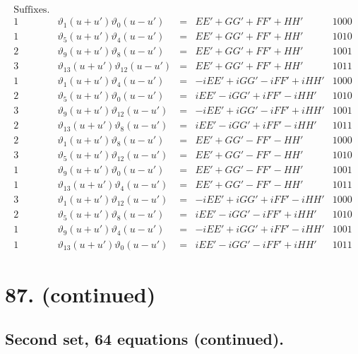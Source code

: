\documentclass[11pt,a4paper]{article}
\newcommand{\uth}[1]{\vartheta_{#1}}
\begin{document}
\[
\begin{array}{ccccc}
\text{Suffixes.} & & & & \\
\hline
1 & \uth{1}(u+u')\uth{0}(u-u') &=& EE' + GG' + FF' + HH' & 1000 \\
1 & \uth{5}(u+u')\uth{4}(u-u') &=& EE' + GG' + FF' + HH' & 1010 \\
2 & \uth{9}(u+u')\uth{8}(u-u') &=& EE' + GG' + FF' + HH' & 1001 \\
3 & \uth{13}(u+u')\uth{12}(u-u') &=& EE' + GG' + FF' + HH' & 1011 \\
\hline
1 & \uth{1}(u+u')\uth{4}(u-u') &=& -iEE' + iGG' - iFF' + iHH' & 1000 \\
2 & \uth{5}(u+u')\uth{0}(u-u') &=& iEE' - iGG' + iFF' - iHH' & 1010 \\
3 & \uth{9}(u+u')\uth{12}(u-u') &=& -iEE' + iGG' - iFF' + iHH' & 1001 \\
2 & \uth{13}(u+u')\uth{8}(u-u') &=& iEE' - iGG' + iFF' - iHH' & 1011 \\
\hline
2 & \uth{1}(u+u')\uth{8}(u-u') &=& EE' + GG' - FF' - HH' & 1000 \\
3 & \uth{5}(u+u')\uth{12}(u-u') &=& EE' + GG' - FF' - HH' & 1010 \\
1 & \uth{9}(u+u')\uth{0}(u-u') &=& EE' + GG' - FF' - HH' & 1001 \\
1 & \uth{13}(u+u')\uth{4}(u-u') &=& EE' + GG' - FF' - HH' & 1011 \\
\hline
3 & \uth{1}(u+u')\uth{12}(u-u') &=& -iEE' + iGG' + iFF' - iHH' & 1000 \\
2 & \uth{5}(u+u')\uth{8}(u-u') &=& iEE' - iGG' - iFF' + iHH' & 1010 \\
1 & \uth{9}(u+u')\uth{4}(u-u') &=& -iEE' + iGG' + iFF' - iHH' & 1001 \\
1 & \uth{13}(u+u')\uth{0}(u-u') &=& iEE' - iGG' - iFF' + iHH' & 1011
\end{array}
\]


\newpage
\section*{87. (continued)}
\label{sec:87cont}

\subsection*{Second set, 64 equations (continued).}
\end{document}
